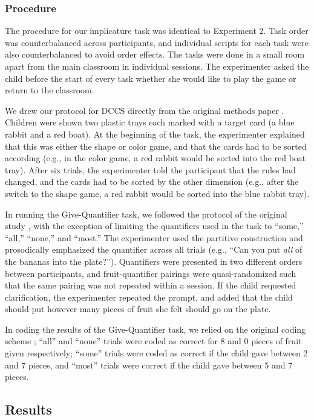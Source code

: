 \documentclass[man]{apa2}
\begin{document}
\subsubsection{Procedure}
The procedure for our implicature task was identical to Experiment 2. Task order was counterbalanced across participants, and individual scripts for each task were also counterbalanced to avoid order effects. The tasks were done in a small room apart from the main classroom in individual sessions. The experimenter asked the child before the start of every task whether she would like to play the game or return to the classroom. 

We drew our protocol for DCCS directly from the original methods paper \cite{zelazo2006}. Children were shown two plastic trays each marked with a target card (a blue rabbit and a red boat). At the beginning of the task, the experimenter explained that this was either the shape or color game, and that the cards had to be sorted according (e.g., in the color game, a red rabbit would be sorted into the red boat tray). After six trials, the experimenter told the participant that the rules had changed, and the cards had to be sorted by the other dimension (e.g., after the switch to the shape game, a red rabbit would be sorted into the blue rabbit tray).

In running the Give-Quantifier task, we followed the protocol of the original study \cite{barner2009}, with the exception of limiting the quantifiers used in the task to ``some,'' ``all,'' ``none,'' and ``most.'' The experimenter used the partitive construction and prosodically emphasized the quantifier across all trials (e.g., ``Can you put \textit{all} of the bananas into the plate?''). Quantifiers were presented in two different orders between participants, and fruit-quantifier pairings were quasi-randomized such that the same pairing was not repeated within a session. If the child requested clarification, the experimenter repeated the prompt, and added that the child should put however many pieces of fruit she felt should go on the plate. 

In coding the results of the Give-Quantifier task, we relied on the original coding scheme \cite{barner2009}; ``all'' and ``none'' trials were coded as correct for 8 and 0 pieces of fruit given respectively; ``some'' trials were coded as correct if the child gave between 2 and 7 pieces, and ``most'' trials were correct if the child gave between 5 and 7 pieces. 

\subsection{Results}
\end{document}
